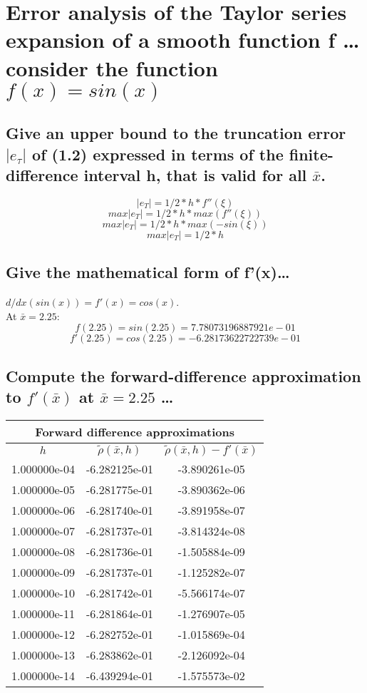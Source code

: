 \documentclass[11pt]{modart}
\begin{document}
\section{Error analysis of the Taylor series expansion of a smooth function f \ldots consider the function $f(x)=sin(x)$}
\subsection{Give an upper bound to the truncation error $|e_\tau|$ of (1.2) expressed in terms of the finite-difference interval h, that is valid for all $\bar{x}$.}
$$|e_T|=1/2*h*f''(\xi)$$
$$max |e_T|=1/2*h*max(f''(\xi))$$
$$max |e_T|=1/2*h*max(-sin(\xi))$$
$$max |e_T|=1/2*h$$
\subsection{Give the mathematical form of f'(x)\ldots}
$d/dx(sin(x))=f'(x)=cos(x)$.\\
At $\bar{x} = 2.25$:
$$f(2.25)=sin(2.25)=7.78073196887921e-01$$
$$f'(2.25)=cos(2.25)=-6.28173622722739e-01$$
\subsection{Compute the forward-difference approximation to $f'(\bar{x})$ at $\bar{x} = 2.25$ \ldots}
\begin{tabular}{|c|c|c|}
  \hline
  \multicolumn{3}{|c|}{Forward difference approximations}\\
  \hline
  $h$ & $\tilde{\rho} (\bar{x}, h)$ & $\tilde{\rho} (\bar{x}, h)- f'(\bar{x})$ \\
  \hline
  1.000000e-04 & -6.282125e-01 & -3.890261e-05\\
  \hline
  1.000000e-05 & -6.281775e-01 & -3.890362e-06\\
  \hline
  1.000000e-06 & -6.281740e-01 & -3.891958e-07\\
  \hline
  1.000000e-07 & -6.281737e-01 & -3.814324e-08\\
  \hline
  1.000000e-08 & -6.281736e-01 & -1.505884e-09\\
  \hline
  1.000000e-09 & -6.281737e-01 & -1.125282e-07\\
  \hline
  1.000000e-10 & -6.281742e-01 & -5.566174e-07\\
  \hline
  1.000000e-11 & -6.281864e-01 & -1.276907e-05\\
  \hline
  1.000000e-12 & -6.282752e-01 & -1.015869e-04\\
  \hline
  1.000000e-13 & -6.283862e-01 & -2.126092e-04\\
  \hline
  1.000000e-14 & -6.439294e-01 & -1.575573e-02\\
  \hline
\end{tabular}\\
\end{document}
